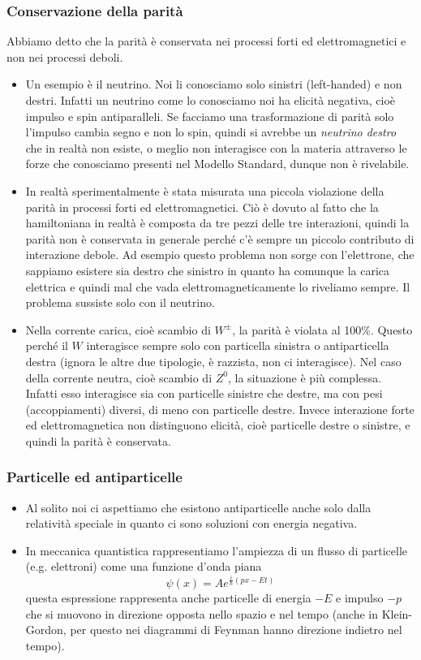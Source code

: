 \subsubsection{Conservazione della parità}
Abbiamo detto che la parità è conservata nei processi forti ed elettromagnetici e non nei processi deboli. 
\begin{itemize}
    \item Un esempio è il neutrino. Noi li conosciamo solo sinistri (left-handed) e non destri. Infatti un neutrino come lo conosciamo noi ha elicità negativa, cioè impulso e spin antiparalleli. Se facciamo una trasformazione di parità solo l'impulso cambia segno e non lo spin, quindi si avrebbe un \textit{neutrino destro} che in realtà non esiste, o meglio non interagisce con la materia attraverso le forze che conosciamo presenti nel Modello Standard, dunque non è rivelabile. 
    \item In realtà sperimentalmente è stata misurata una piccola violazione della parità in processi forti ed elettromagnetici. Ciò è dovuto al fatto che la hamiltoniana in realtà è composta da tre pezzi delle tre interazioni, quindi la parità non è conservata in generale perché c'è sempre un piccolo contributo di interazione debole. Ad esempio questo problema non sorge con l'elettrone, che sappiamo esistere sia destro che sinistro in quanto ha comunque la carica elettrica e quindi mal che vada elettromagneticamente lo riveliamo sempre. Il problema sussiste solo con il neutrino.
    \item Nella corrente carica, cioè scambio di $W^\pm$, la parità è violata al 100\%. Questo perché il $W$ interagisce sempre solo con particella sinistra o antiparticella destra (ignora le altre due tipologie, è razzista, non ci interagisce). Nel caso della corrente neutra, cioè scambio di $Z^0$, la situazione è più complessa. Infatti esso interagisce sia con particelle sinistre che destre, ma con pesi (accoppiamenti) diversi, di meno con particelle destre. Invece interazione forte ed elettromagnetica non distinguono elicità, cioè particelle destre o sinistre, e quindi la parità è conservata. 
\end{itemize}
\subsubsection{Particelle ed antiparticelle}
\begin{itemize}
    \item Al solito noi ci aspettiamo che esistono antiparticelle anche solo dalla relatività speciale in quanto ci sono soluzioni con energia negativa. 
    \item In meccanica quantistica rappresentiamo l'ampiezza di un flusso di particelle (e.g. elettroni) come una funzione d'onda piana
    \begin{equation*}
        \psi(x)=Ae^{\frac i\hbar(px-E t)}
    \end{equation*}
    questa espressione rappresenta anche particelle di energia $-E$ e impulso $-p$ che si muovono in direzione opposta nello spazio e nel tempo (anche in Klein-Gordon, per questo nei diagrammi di Feynman hanno direzione indietro nel tempo).
\end{itemize}
